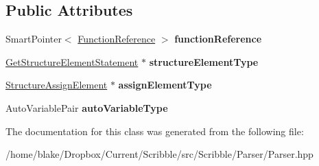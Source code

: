 \subsection*{Public Attributes}
\begin{DoxyCompactItemize}
\item 
\hypertarget{class_scribble_core_1_1_parser_reference_ac1d91061b77ed79265e184e992b5dfe7}{Smart\-Pointer$<$ \hyperlink{class_scribble_core_1_1_function_reference}{Function\-Reference} $>$ {\bfseries function\-Reference}}\label{class_scribble_core_1_1_parser_reference_ac1d91061b77ed79265e184e992b5dfe7}

\item 
\hypertarget{class_scribble_core_1_1_parser_reference_a637e85d515b38865bfaee3f3e0314d1b}{\hyperlink{class_scribble_core_1_1_get_structure_element_statement}{Get\-Structure\-Element\-Statement} $\ast$ {\bfseries structure\-Element\-Type}}\label{class_scribble_core_1_1_parser_reference_a637e85d515b38865bfaee3f3e0314d1b}

\item 
\hypertarget{class_scribble_core_1_1_parser_reference_a8aa51bfc4b87577b0f99570828a4fb9e}{\hyperlink{class_scribble_core_1_1_structure_assign_element}{Structure\-Assign\-Element} $\ast$ {\bfseries assign\-Element\-Type}}\label{class_scribble_core_1_1_parser_reference_a8aa51bfc4b87577b0f99570828a4fb9e}

\item 
\hypertarget{class_scribble_core_1_1_parser_reference_ad076a03489530a2021aac5d8d7761eed}{Auto\-Variable\-Pair {\bfseries auto\-Variable\-Type}}\label{class_scribble_core_1_1_parser_reference_ad076a03489530a2021aac5d8d7761eed}

\end{DoxyCompactItemize}


The documentation for this class was generated from the following file\-:\begin{DoxyCompactItemize}
\item 
/home/blake/\-Dropbox/\-Current/\-Scribble/src/\-Scribble/\-Parser/Parser.\-hpp\end{DoxyCompactItemize}
